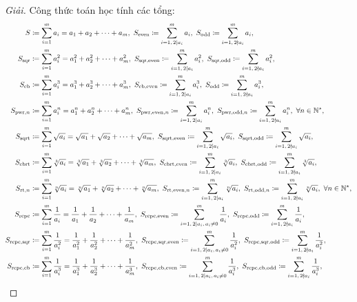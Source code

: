 \documentclass{article}
\begin{document}
\begin{proof}[Giải]
	Công thức toán học tính các tổng:
	\begin{align*}
		S&\coloneqq\sum_{i=1}^m a_i = a_1 + a_2 + \cdots + a_m,\ S_{\rm even}\coloneqq\sum_{i=1,\,2\mid a_i}^m a_i,\ S_{\rm odd}\coloneqq\sum_{i=1,\,2\nmid a_i}^m a_i,\\
		S_{\rm sqr}&\coloneqq\sum_{i=1}^m a_i^2 = a_1^2 + a_2^2 + \cdots + a_m^2,\ S_{\rm sqr,even}\coloneqq\sum_{i=1,\,2\mid a_i}^m a_i^2,\ S_{\rm sqr,odd}\coloneqq\sum_{i=1,\,2\nmid a_i}^m a_i^2,\\
		S_{\rm cb}&\coloneqq\sum_{i=1}^m a_i^3 = a_1^3 + a_2^3 + \cdots + a_m^3,\ S_{\rm cb, even}\coloneqq\sum_{i=1,\,2\mid a_i}^m a_i^3,\ S_{\rm odd}\coloneqq\sum_{i=1,\,2\nmid a_i}^m a_i^3,\\
		S_{{\rm pwr},n}&\coloneqq\sum_{i=1}^m a_i^n = a_1^n + a_2^n + \cdots + a_m^n,\ S_{{\rm pwr,even},n}\coloneqq\sum_{i=1,\,2\mid a_i}^m a_i^n,\ S_{{\rm pwr,odd},n}\coloneqq\sum_{i=1,\,2\nmid a_i}^m a_i^n,\ \forall n\in\mathbb{N}^\star,\\
		S_{\rm sqrt}&\coloneqq\sum_{i=1}^m \sqrt{a_i} = \sqrt{a_1} + \sqrt{a_2} + \cdots + \sqrt{a_m},\ S_{\rm sqrt,even}\coloneqq\sum_{i=1,\,2\mid a_i}^m \sqrt{a_i},\ S_{\rm sqrt,odd}\coloneqq\sum_{i=1,\,2\nmid a_i}^m \sqrt{a_i},\\
		S_{\rm cbrt}&\coloneqq\sum_{i=1}^m \sqrt[3]{a_i} = \sqrt[3]{a_1} + \sqrt[3]{a_2} + \cdots + \sqrt[3]{a_m},\ S_{\rm cbrt,even}\coloneqq\sum_{i=1,\,2\mid a_i}^m \sqrt[3]{a_i},\ S_{\rm cbrt,odd}\coloneqq\sum_{i=1,\,2\nmid a_i}^m \sqrt[3]{a_i},\\
		S_{{\rm rt},n}&\coloneqq\sum_{i=1}^m \sqrt[n]{a_i} = \sqrt[n]{a_1} + \sqrt[n]{a_2} + \cdots + \sqrt[n]{a_m},\ S_{{\rm rt,even},n}\coloneqq\sum_{i=1,\,2\mid a_i}^m \sqrt[n]{a_i},\ S_{{\rm rt,odd},n}\coloneqq\sum_{i=1,\,2\nmid a_i}^m \sqrt[n]{a_i},\ \forall n\in\mathbb{N}^\star,\\
		S_{\rm rcpc}&\coloneqq\sum_{i=1}^m \frac{1}{a_i} = \frac{1}{a_1} + \frac{1}{a_2} + \cdots + \frac{1}{a_m},\ S_{\rm rcpc,even}\coloneqq\sum_{i=1,\,2\mid a_i,\,a_i\ne0}^m \frac{1}{a_i},\ S_{\rm rcpc,odd}\coloneqq\sum_{i=1,\,2\nmid a_i}^m \frac{1}{a_i},\\
		S_{\rm rcpc,sqr}&\coloneqq\sum_{i=1}^m \frac{1}{a_i^2} = \frac{1}{a_1^2} + \frac{1}{a_2^2} + \cdots + \frac{1}{a_m^2},\ S_{\rm rcpc,sqr,even}\coloneqq\sum_{i=1,\,2\mid a_i,\,a_i\ne0}^m \frac{1}{a_i^2},\ S_{\rm rcpc,sqr,odd}\coloneqq\sum_{i=1,\,2\nmid a_i}^m \frac{1}{a_i^2},\\
		S_{\rm rcpc,cb}&\coloneqq\sum_{i=1}^m \frac{1}{a_i^3} = \frac{1}{a_1^3} + \frac{1}{a_2^3} + \cdots + \frac{1}{a_m^3},\ S_{\rm rcpc,cb,even}\coloneqq\sum_{i=1,\,2\mid a_i,\,a_i\ne0}^m \frac{1}{a_i^3},\ S_{\rm rcpc,cb,odd}\coloneqq\sum_{i=1,\,2\nmid a_i}^m \frac{1}{a_i^3},\\

\end{align*}
\end{proof}
\end{document}
